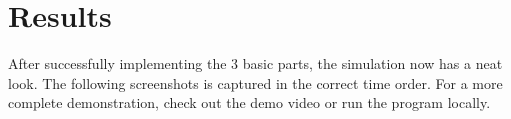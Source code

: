 \documentclass[acmtog]{acmart}
\begin{document}
\section{Results}
After successfully implementing the 3 basic parts, the simulation now has a neat look. The following screenshots is captured in the correct time order. For a more complete demonstration, check out the demo video or run the program locally.
\begin{figure}[h]
	\centering
\end{figure}
\end{document}

